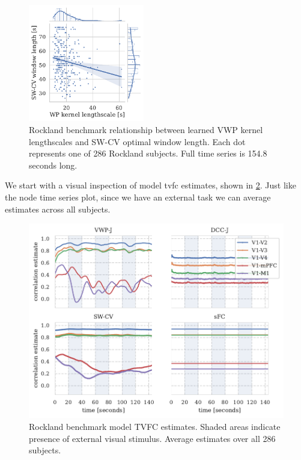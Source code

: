 \begin{figure}[t]
  \centering
  \includegraphics[width=0.45\textwidth]{fig/rockland/CHECKERBOARD645/lengthscale_optimal_window_length_relations}
  \caption{
    Rockland benchmark relationship between learned VWP kernel lengthscales and SW-CV optimal window length.
    Each dot represents one of 286 Rockland subjects.
    Full time series is 154.8 seconds long.
  }
  \label{fig:rockland-relationship-lengthscale-optimal-window-length}
\end{figure}


We start with a visual inspection of model \gls{tvfc} estimates, shown in \cref{fig:rockland-results-tvfc-predictions}.
Just like the node time series plot, since we have an external task we can average estimates across all subjects.


\begin{figure}[ht]
  \centering
  \includegraphics[width=\textwidth]{fig/rockland/CHECKERBOARD645/TVFC_predictions/all_subjects_joint_correlations}
  \caption{
    Rockland benchmark model TVFC estimates.
    Shaded areas indicate presence of external visual stimulus.
    Average estimates over all 286 subjects.
  }
  \label{fig:rockland-results-tvfc-predictions}
\end{figure}


